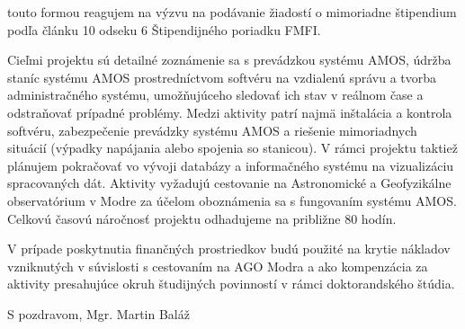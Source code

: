 \documentclass[12pt, a4paper, oneside]{report}
\begin{document}
    touto formou reagujem na výzvu na podávanie žiadostí o mimoriadne štipendium podľa
    článku 10 odseku 6 Štipendijného poriadku FMFI.
    
    Cieľmi projektu sú detailné zoznámenie sa s prevádzkou systému AMOS,    
    údržba staníc systému AMOS prostredníctvom softvéru na vzdialenú správu
    a tvorba administračného systému, umožňujúceho sledovať ich stav v reálnom čase a odstraňovať prípadné problémy.
    Medzi aktivity patrí najmä inštalácia a kontrola softvéru, zabezpečenie prevádzky systému AMOS
    a riešenie mimoriadnych situácií (výpadky napájania alebo spojenia so stanicou).
    V rámci projektu taktiež plánujem pokračovať vo vývoji databázy a informačného systému na vizualizáciu spracovaných dát.
    Aktivity vyžadujú cestovanie na Astronomické a Geofyzikálne observatórium
    v Modre za účelom oboznámenia sa s fungovaním systému AMOS.
    Celkovú časovú náročnosť projektu odhadujeme na približne 80 hodín.

    V prípade poskytnutia finančných prostriedkov budú použité na krytie nákladov vzniknutých
    v súvislosti s cestovaním na AGO Modra a ako kompenzácia za aktivity presahujúce okruh študijných povinností
    v rámci doktorandského štúdia.
        
    \vspace*{6mm}
    
    S pozdravom,    
    \hfill Mgr. Martin Baláž

    
\end{document}
